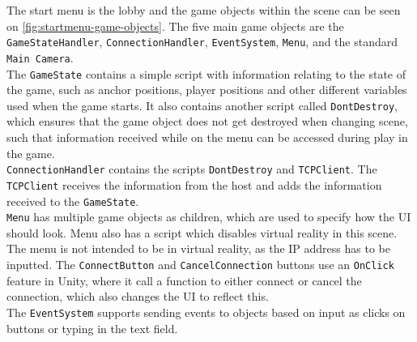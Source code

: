 The start menu is the lobby and the game objects within the scene can be seen on \autoref{fig:startmenu-game-objects}.
The five main game objects are the \texttt{GameStateHandler}, \texttt{ConnectionHandler}, \texttt{EventSystem}, \texttt{Menu}, and the standard \texttt{Main Camera}.
\\
The \texttt{GameState} contains a simple script with information relating to the state of the game, such as anchor positions, player positions and other different variables used when the game starts.
It also contains another script called \texttt{DontDestroy}, which ensures that the game object does not get destroyed when changing scene, such that information received while on the menu can be accessed during play in the game.
\\
\texttt{ConnectionHandler} contains the scripts \texttt{DontDestroy} and \texttt{TCPClient}.
The \texttt{TCPClient} receives the information from the host and adds the information received to the \texttt{GameState}.
\\
\texttt{Menu} has multiple game objects as children, which are used to specify how the UI should look.
Menu also has a script which disables virtual reality in this scene.
The menu is not intended to be in virtual reality, as the IP address has to be inputted.
The \texttt{ConnectButton} and \texttt{CancelConnection} buttons use an \texttt{OnClick} feature in Unity, where it call a function to either connect or cancel the connection, which also changes the UI to reflect this.
\\
The \texttt{EventSystem} supports sending events to objects based on input as clicks on buttons or typing in the text field.


